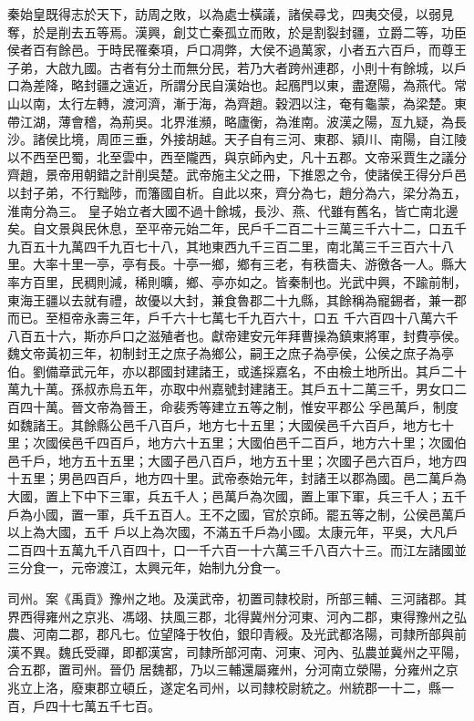 \begin{pinyinscope}
 秦始皇既得志於天下，訪周之敗，以為處士橫議，諸侯尋戈，四夷交侵，以弱見奪，於是削去五等焉。漢興，創艾亡秦孤立而敗，於是割裂封疆，立爵二等，功臣侯者百有餘邑。于時民罹秦項，戶口凋弊，大侯不過萬家，小者五六百戶，而尊王子弟，大啟九國。古者有分土而無分民，若乃大者跨州連郡，小則十有餘城，以戶
 口為差降，略封疆之遠近，所謂分民自漢始也。起鴈門以東，盡遼陽，為燕代。常山以南，太行左轉，渡河濟，漸于海，為齊趙。穀泗以注，奄有龜蒙，為梁楚。東帶江湖，薄會稽，為荊吳。北界淮瀕，略廬衡，為淮南。波漢之陽，亙九疑，為長沙。諸侯比境，周匝三垂，外接胡越。天子自有三河、東郡、潁川、南陽，自江陵以不西至巴蜀，北至雲中，西至隴西，與京師內史，凡十五郡。文帝采賈生之議分齊趙，景帝用朝錯之計削吳楚。武帝施主父之冊，下推恩之令，使諸侯王得分戶邑以封子弟，不行黜陟，而籓國自析。自此以來，齊分為七，趙分為六，梁分為五，淮南分為三。
 皇子始立者大國不過十餘城，長沙、燕、代雖有舊名，皆亡南北邊矣。自文景與民休息，至平帝元始二年，民戶千二百二十三萬三千六十二，口五千九百五十九萬四千九百七十八，其地東西九千三百二里，南北萬三千三百六十八里。大率十里一亭，亭有長。十亭一鄉，鄉有三老，有秩嗇夫、游徼各一人。縣大率方百里，民稠則減，稀則曠，鄉、亭亦如之。皆秦制也。光武中興，不踰前制，東海王疆以去就有禮，故優以大封，兼食魯郡二十九縣，其餘稱為寵錫者，兼一郡而已。至桓帝永壽三年，戶千六十七萬七千九百六十，口五
 千六百四十八萬六千八百五十六，斯亦戶口之滋殖者也。獻帝建安元年拜曹操為鎮東將軍，封費亭侯。魏文帝黃初三年，初制封王之庶子為鄉公，嗣王之庶子為亭侯，公侯之庶子為亭伯。劉備章武元年，亦以郡國封建諸王，或遙採嘉名，不由檢土地所出。其戶二十萬九十萬。孫叔赤烏五年，亦取中州嘉號封建諸王。其戶五十二萬三千，男女口二百四十萬。晉文帝為晉王，命裴秀等建立五等之制，惟安平郡公
 孚邑萬戶，制度如魏諸王。其餘縣公邑千八百戶，地方七十五里；大國侯邑千六百戶，地方七十里；次國侯邑千四百戶，地方六十五里；大國伯邑千二百戶，地方六十里；次國伯邑千戶，地方五十五里；大國子邑八百戶，地方五十里；次國子邑六百戶，地方四十五里；男邑四百戶，地方四十里。武帝泰始元年，封諸王以郡為國。邑二萬戶為大國，置上下中下三軍，兵五千人；邑萬戶為次國，置上軍下軍，兵三千人；五千戶為小國，置一軍，兵千五百人。王不之國，官於京師。罷五等之制，公侯邑萬戶以上為大國，五千
 戶以上為次國，不滿五千戶為小國。太康元年，平吳，大凡戶二百四十五萬九千八百四十，口一千六百一十六萬三千八百六十三。而江左諸國並三分食一，元帝渡江，太興元年，始制九分食一。



 司州。案《禹貢》豫州之地。及漢武帝，初置司隸校尉，所部三輔、三河諸郡。其界西得雍州之京兆、馮翊、扶風三郡，北得冀州分河東、河內二郡，東得豫州之弘農、河南二郡，郡凡七。位望降于牧伯，銀印青綬。及光武都洛陽，司隸所部與前漢不異。魏氏受禪，即都漢宮，司隸所部河南、河東、河內、弘農並冀州之平陽，合五郡，置司州。晉仍
 居魏都，乃以三輔還屬雍州，分河南立滎陽，分雍州之京兆立上洛，廢東郡立頓丘，遂定名司州，以司隸校尉統之。州統郡一十二，縣一百，戶四十七萬五千七百。




\end{pinyinscope}
